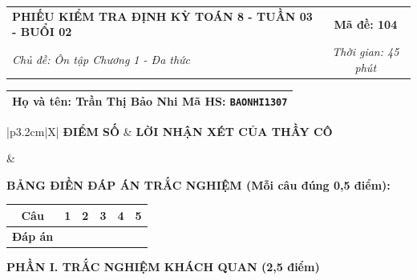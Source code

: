 \documentclass[12pt,a4paper]{article}
\begin{document}
\newpage


\noindent
\begin{tabularx}{\linewidth}{|X|c|}
\hline
\textbf{PHIẾU KIỂM TRA ĐỊNH KỲ TOÁN 8 - TUẦN 03 - BUỔI 02} & \textbf{Mã đề: 104} \\
\textit{Chủ đề: Ôn tập Chương 1 - Đa thức} & \textit{Thời gian: 45 phút} \\
\hline
\end{tabularx}

\vspace{1mm}

\noindent
\begin{tabularx}{\linewidth}{|X|}
\hline
\rule[-2mm]{0pt}{7.5mm}\textbf{Họ và tên:} \textbf{\large Trần Thị Bảo Nhi} \hfill \textbf{Mã HS:} \texttt{BAONHI1307} \quad \\
\hline
\end{tabularx}

\vspace{1mm}

\noindent
\begin{tabularx}{\linewidth}{|p{3.2cm}|X|}
\hline
\centering\textbf{ĐIỂM SỐ} & \centering\textbf{LỜI NHẬN XÉT CỦA THẦY CÔ} \tabularnewline
\hline
\rule{0pt}{1.3cm} & \tabularnewline
\hline
\end{tabularx}

\vspace{1.2mm}

\noindent\textbf{BẢNG ĐIỀN ĐÁP ÁN TRẮC NGHIỆM (Mỗi câu đúng 0,5 điểm):}
\vspace{0.8mm}

\noindent
\renewcommand{\arraystretch}{1.35}
\begin{tabularx}{\linewidth}{|c|*{5}{>{\centering\arraybackslash}X|}}
\hline
\textbf{Câu} & \textbf{1} & \textbf{2} & \textbf{3} & \textbf{4} & \textbf{5} \\
\hline
\textbf{Đáp án} & & & & & \\
\hline
\end{tabularx}
\renewcommand{\arraystretch}{1.0}

\vspace{1.5mm}

\noindent\textbf{\large PHẦN I. TRẮC NGHIỆM KHÁCH QUAN (2,5 điểm)}
\vspace{1mm}
\end{document}
